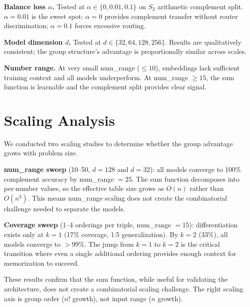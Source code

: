 \documentclass[10pt, letterpaper]{article}
\begin{document}
\textbf{Balance loss $\alpha$.} Tested at $\alpha \in \{0, 0.01, 0.1\}$ on $S_2$ arithmetic complement split. $\alpha = 0.01$ is the sweet spot: $\alpha = 0$ provides complement transfer without router discrimination; $\alpha = 0.1$ forces excessive routing.

\textbf{Model dimension $d$.} Tested at $d \in \{32, 64, 128, 256\}$. Results are qualitatively consistent; the group structure's advantage is proportionally similar across scales.

\textbf{Number range.} At very small num\_range ($\leq 10$), embeddings lack sufficient training context and all models underperform. At num\_range $\geq 15$, the sum function is learnable and the complement split provides clear signal.

\section{Scaling Analysis}
\label{app:scaling}

We conducted two scaling studies to determine whether the group advantage grows with problem size.

\textbf{num\_range sweep} (10--50, $d = 128$ and $d = 32$): all models converge to 100\% complement accuracy by num\_range $= 25$. The sum function decomposes into per-number values, so the effective table size grows as $O(n)$ rather than $O(n^3)$. This means num\_range scaling does not create the combinatorial challenge needed to separate the models.

\textbf{Coverage sweep} (1--4 orderings per triple, num\_range $= 15$): differentiation exists only at $k = 1$ (17\% coverage, 1:5 generalization). By $k = 2$ (33\%), all models converge to $>$99\%. The jump from $k = 1$ to $k = 2$ is the critical transition where even a single additional ordering provides enough context for memorization to succeed.

These results confirm that the sum function, while useful for validating the architecture, does not create a combinatorial scaling challenge. The right scaling axis is group order ($n!$ growth), not input range ($n$ growth).
\end{document}
